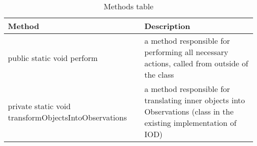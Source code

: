 \begin{table}[H]
\centering
\caption{Methods table}
\setlength{\extrarowheight}{2pt}
\label{tab:class_methods_OD}
\begin{tabularx}{\textwidth}{|X|X|}
\hline
\textbf{Method} & \textbf{Description} \\ \hline
public static void \mbox{perform} & a method responsible for performing all necessary actions, called from outside of the class \\ \hline
private static void \mbox{transformObjectsIntoObservations} & a method responsible for translating inner objects into Observations (class in the existing implementation of IOD)\\ \hline
\end{tabularx}
\end{table}